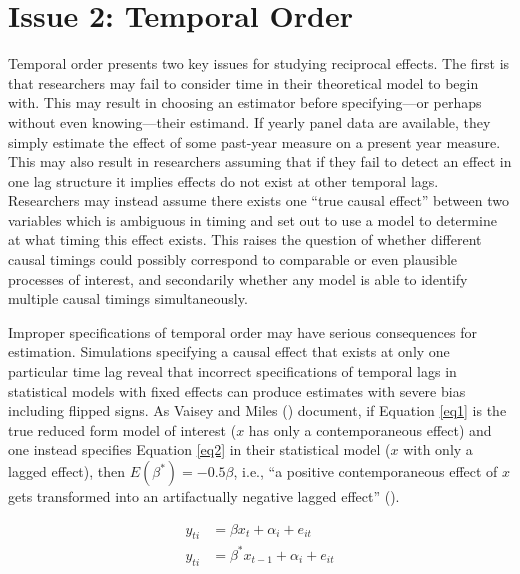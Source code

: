 \documentclass[
  letterpaper,
  DIV=11,
  numbers=noendperiod]{scrartcl}
\begin{document}
\section{Issue 2: Temporal Order}\label{issue-2-temporal-order}

Temporal order presents two key issues for studying reciprocal effects.
The first is that researchers may fail to consider time in their
theoretical model to begin with. This may result in choosing an
estimator before specifying---or perhaps without even knowing---their
estimand. If yearly panel data are available, they simply estimate the
effect of some past-year measure on a present year measure. This may
also result in researchers assuming that if they fail to detect an
effect in one lag structure it implies effects do not exist at other
temporal lags. Researchers may instead assume there exists one ``true
causal effect'' between two variables which is ambiguous in timing and
set out to use a model to determine at what timing this effect exists.
This raises the question of whether different causal timings could
possibly correspond to comparable or even plausible processes of
interest, and secondarily whether any model is able to identify multiple
causal timings simultaneously.

Improper specifications of temporal order may have serious consequences
for estimation. Simulations specifying a causal effect that exists at
only one particular time lag reveal that incorrect specifications of
temporal lags in statistical models with fixed effects can produce
estimates with severe bias including flipped signs. As Vaisey and Miles
() document, if Equation \ref{eq1} is
the true reduced form model of interest (\(x\) has only a
contemporaneous effect) and one instead specifies Equation \ref{eq2} in
their statistical model (\(x\) with only a lagged effect), then
\(E(\beta^*) = -0.5\beta\), i.e., ``a positive contemporaneous effect of
\(x\) gets transformed into an artifactually negative lagged effect''
().

\begin{align}
y_{ti} &= \beta x_t + \alpha_i + e_{it} \label{eq1}\\
y_{ti} &= \beta^* x_{t-1} + \alpha_i + e_{it} \label{eq2}
\end{align}
\end{document}
